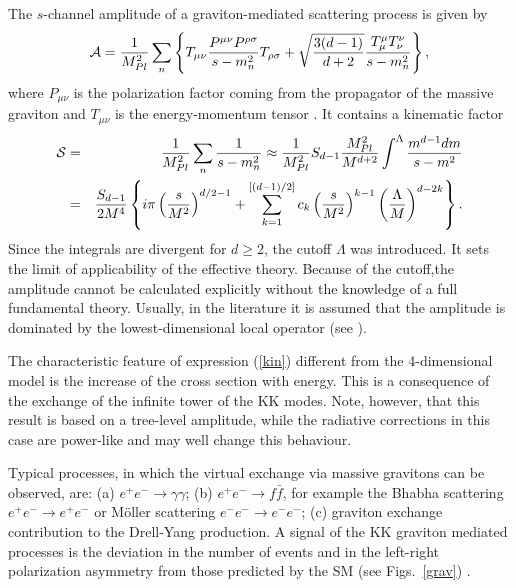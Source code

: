 \documentclass{cernyrep}
\begin{document}
The $s$-channel amplitude of a graviton-mediated scattering
process is given by
\begin{equation}\label{amp}
{\cal A} = \frac{1}{M_{Pl}^{2}} \sum_{n} \left\{ T_{\mu \nu}
\frac{P^{\mu \nu} P^{\rho \sigma}}{s-m_{n}^{2}} T_{\rho \sigma} +
\sqrt{\frac{3(d-1)}{d+2}} \frac{T^{\mu}_{\mu}
T^{\nu}_{\nu}}{s-m_{n}^{2}} \right\},
\end{equation}
where $P_{\mu \nu}$ is the polarization factor coming from the
propagator of the massive graviton and $T_{\mu \nu}$ is the
energy-momentum tensor \cite{GRW}. It contains  a kinematic factor
\begin{eqnarray}
  {\cal S} & = &  \frac{1}{M_{Pl}^{2}}
\sum_{n}\frac{1}{s-m_{n}^{2}} \approx \frac{1}{M_{Pl}^{2}} S_{d-1}
\frac{M_{Pl}^{2}}{M^{d+2}}
\int^{\Lambda} \frac{m^{d-1}dm}{s-m^{2}}  \nonumber \\
   & = &  \frac{S_{d-1}}{2M^{4}}
\left\{ i\pi \left( \frac{s}{M^{2}} \right)^{d/2-1}  +
\sum_{k=1}^{[(d-1)/2]} c_{k} \left( \frac{s}{M^{2}} \right)^{k-1}
\left( \frac{\Lambda}{M} \right)^{d-2k} \right\}.   \label{kin}
\end{eqnarray}
Since the integrals are divergent for $d \geq 2$, the cutoff
$\Lambda$ was introduced. It sets the limit of applicability of
the effective theory. Because of the cutoff,the amplitude cannot
be calculated explicitly without the knowledge of a full
fundamental theory. Usually, in the literature it is assumed that
the amplitude is dominated by the lowest-dimensional local
operator (see \cite{GRW}).

The characteristic feature of expression (\ref{kin}) different
from the 4-dimensional model is the increase of the cross section
with energy. This is a consequence of the exchange of the infinite
tower of the KK modes. Note, however, that this result is based on
a tree-level amplitude, while the radiative corrections in this
case are power-like and may well change this behaviour.


Typical processes, in which the virtual exchange via massive
gravitons can be observed, are: (a) $e^{+}e^{-} \rightarrow \gamma
\gamma$; (b) $e^{+}e^{-} \rightarrow f \bar{f}$, for example the
Bhabha scattering $e^{+}e^{-} \rightarrow e^{+}e^{-}$ or M\"oller
scattering $e^{-}e^{-} \rightarrow e^{-}e^{-}$; (c) graviton
exchange contribution to the Drell-Yang production. A signal of
the KK graviton mediated processes is the deviation in the number
of events and in the left-right polarization asymmetry from those
predicted by the SM (see Figs.~\ref{grav}) \cite{Ri99}.
\end{document}
